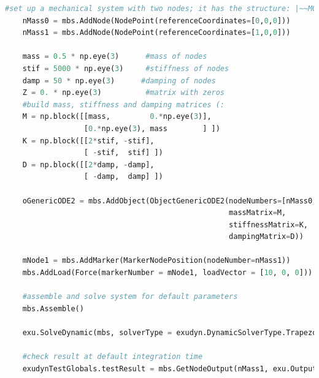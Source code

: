 \label{miniExample_ObjectGenericODE2}
\pythonstyle
\begin{lstlisting}[language=Python, firstnumber=1]
    #set up a mechanical system with two nodes; it has the structure: |~~M0~~M1
    nMass0 = mbs.AddNode(NodePoint(referenceCoordinates=[0,0,0]))
    nMass1 = mbs.AddNode(NodePoint(referenceCoordinates=[1,0,0]))

    mass = 0.5 * np.eye(3)      #mass of nodes
    stif = 5000 * np.eye(3)     #stiffness of nodes
    damp = 50 * np.eye(3)      #damping of nodes
    Z = 0. * np.eye(3)          #matrix with zeros
    #build mass, stiffness and damping matrices (:
    M = np.block([[mass,         0.*np.eye(3)],
                  [0.*np.eye(3), mass        ] ])
    K = np.block([[2*stif, -stif],
                  [ -stif,  stif] ])
    D = np.block([[2*damp, -damp],
                  [ -damp,  damp] ])
    
    oGenericODE2 = mbs.AddObject(ObjectGenericODE2(nodeNumbers=[nMass0,nMass1], 
                                                   massMatrix=M, 
                                                   stiffnessMatrix=K,
                                                   dampingMatrix=D))
    
    mNode1 = mbs.AddMarker(MarkerNodePosition(nodeNumber=nMass1))
    mbs.AddLoad(Force(markerNumber = mNode1, loadVector = [10, 0, 0])) #static solution=10*(1/5000+1/5000)=0.0004

    #assemble and solve system for default parameters
    mbs.Assemble()
    
    exu.SolveDynamic(mbs, solverType = exudyn.DynamicSolverType.TrapezoidalIndex2)

    #check result at default integration time
    exudynTestGlobals.testResult = mbs.GetNodeOutput(nMass1, exu.OutputVariableType.Position)[0]
\end{lstlisting}


